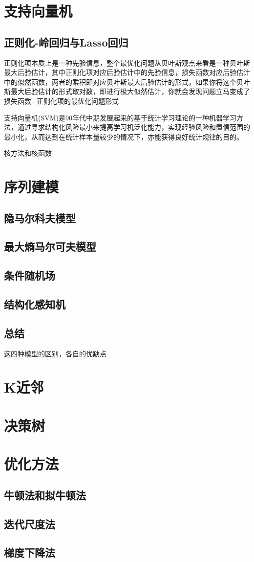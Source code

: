     
    \section{支持向量机}
    \subsection{正则化-岭回归与Lasso回归}
    正则化项本质上是一种先验信息，整个最优化问题从贝叶斯观点来看是一种贝叶斯最大后验估计，其中正则化项对应后验估计中的先验信息，损失函数对应后验估计中的似然函数，两者的乘积即对应贝叶斯最大后验估计的形式，如果你将这个贝叶斯最大后验估计的形式取对数，即进行极大似然估计，你就会发现问题立马变成了损失函数+正则化项的最优化问题形式
    
    支持向量机(SVM)是90年代中期发展起来的基于统计学习理论的一种机器学习方法，通过寻求结构化风险最小来提高学习机泛化能力，实现经验风险和置信范围的最小化，从而达到在统计样本量较少的情况下，亦能获得良好统计规律的目的。
    
    核方法和核函数
    \section{序列建模}
    \subsection{隐马尔科夫模型}
    \subsection{最大熵马尔可夫模型}
    \subsection{条件随机场}
    \subsection{结构化感知机}
    \subsection{总结}
    这四种模型的区别，各自的优缺点
    \section{K近邻}
    \section{决策树}
    \section{优化方法}
    \subsection{牛顿法和拟牛顿法}
    \subsection{迭代尺度法}
    \subsection{梯度下降法}